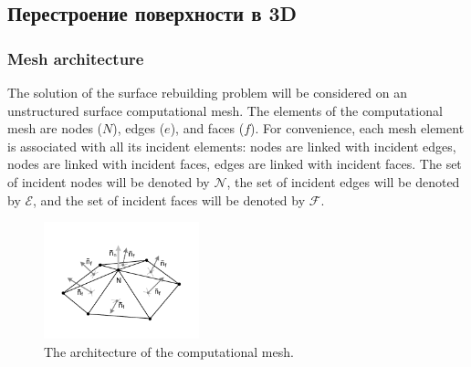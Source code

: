 \subsection{Перестроение поверхности в 3D}

\subsubsection{Mesh architecture}

The solution of the surface rebuilding problem will be considered on an unstructured surface computational mesh.
The elements of the computational mesh are nodes ($N$), edges ($e$), and faces ($f$).
For convenience, each mesh element is associated with all its incident elements: nodes are linked with incident edges, nodes are linked with incident faces, edges are linked with incident faces.
The set of incident nodes will be denoted by $\mathscr{N}$, the set of incident edges will be denoted by $\mathscr{E}$, and the set of incident faces will be denoted by $\mathscr{F}$.

\begin{figure}[ht]
\centering
\includegraphics[width=0.4\textwidth]{pics/text_1_remesh_3d/pic_architecture.pdf}
\caption{The architecture of the computational mesh.}\label{fig:pic_architecture}
\end{figure}


